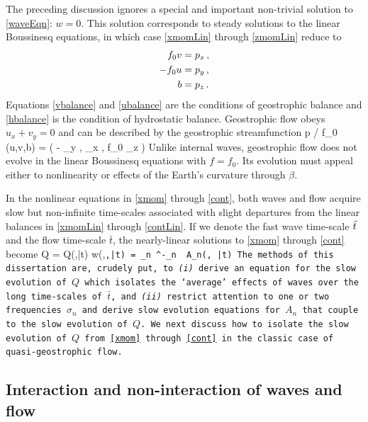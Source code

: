 \documentclass[12pt, oneside]{book}
\begin{document}
The preceding discussion ignores a special and important non-trivial solution to \eqref{waveEqn}: $w=0$.  This solution corresponds to steady solutions to the linear Boussinesq equations, in which case \eqref{xmomLin} through \eqref{zmomLin} reduce to
\begin{align}
f_0 v &= p_x \com \label{vbalance} \\
- f_0 u &= p_y \com \label{ubalance} \\
b &= p_z \per \label{hbalance} 
\end{align}
Equations \eqref{vbalance} and \eqref{ubalance} are the conditions of geostrophic balance and \eqref{hbalance} is the condition of hydrostatic balance.  Geostrophic flow obeys $u_x + v_y = 0$ and can be described by the geostrophic streamfunction
\beq
\psi {} p / f_0 \com \qquad {} \qquad (u,v,b) = \left ( - \psi_y , \psi_x , f_0 \psi_z \right ) \per
\eeq
Unlike internal waves, geostrophic flow does not evolve in the linear Boussinesq equations with $f=f_0$.  Its evolution must appeal either to nonlinearity or effects of the Earth's curvature through $\beta$.

  In the nonlinear equations in \eqref{xmom} through \eqref{cont}, both waves and flow acquire slow but non-infinite time-scales associated with slight departures from the linear balances in \eqref{xmomLin} through \eqref{contLin}.  If we denote the fast wave time-scale $\tt$ and the flow time-scale $\bar t$, the nearly-linear solutions to \eqref{xmom} through \eqref{cont} become
\beq
Q = Q(\bx,\bar t) \com \qquad {} \qquad w(\bx,\tt,\bar t) = \sum_{n} \ee^{-\ii \sigma_n \tt} A_n(\bx, \bar t) \per
\eeq
The methods of this dissertation are, crudely put, to \textit{(i)} derive an equation for the slow evolution of $Q$ which isolates the `average' effects of waves over the long time-scales of $\bar t$, and \textit{(ii)} restrict attention to one or two frequencies $\sigma_n$ and derive slow evolution equations for $A_n$ that couple to the slow evolution of $Q$.  We next discuss how to isolate the slow evolution of $Q$ from \eqref{xmom} through \eqref{cont} in the classic case of quasi-geostrophic flow.

\subsection{Interaction and non-interaction of waves and flow}
\label{APVintro}
\end{document}
